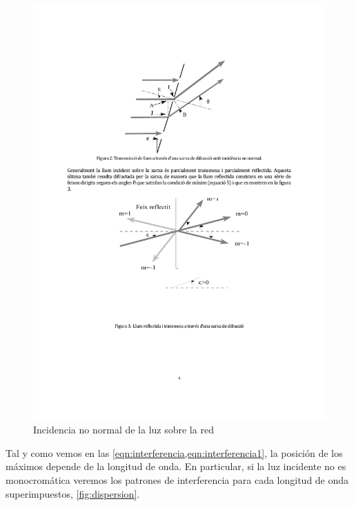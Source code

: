 \documentclass[12pt]{article}
\numberwithin{table}{section}
\numberwithin{figure}{section}
\numberwithin{equation}{section}
\begin{document}
\begin{figure}[htb]
\begin{minipage}{0.45\textwidth}
		\includegraphics[scale = 0.7]{incidencia2.pdf}
		\caption{Incidencia no normal de la luz sobre la red}
		\label{fig:no normal}
	\end{minipage}
\end{figure}

Tal y como vemos en las \cref{eqn:interferencia,eqn:interferencia1}, la posición de los máximos depende de la longitud de onda. En particular, si la luz incidente no es monocromática veremos los patrones de interferencia para cada longitud de onda superimpuestos, \cref{fig:dispersion}. 
\end{document}
